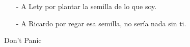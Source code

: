 \begin{acknowledgments}
\begin{itemize}
\setlength{\itemsep}{0pt}
\item[-] A Lety por plantar la semilla de lo que soy.
\item[-] A Ricardo por regar esa semilla, no ser\'ia nada sin ti.
\end{itemize}
\begin{center}
\Huge Don't Panic
\end{center}
\end{acknowledgments}